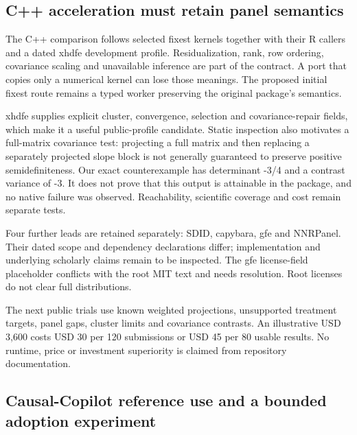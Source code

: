 \hypertarget{c-acceleration-must-retain-panel-semantics}{%
\subsection{C++ acceleration must retain panel
semantics}\label{c-acceleration-must-retain-panel-semantics}}

The C++ comparison follows selected fixest kernels together with their R
callers and a dated xhdfe development profile. Residualization, rank,
row ordering, covariance scaling and unavailable inference are part of
the contract. A port that copies only a numerical kernel can lose those
meanings. The proposed initial fixest route remains a typed worker
preserving the original package's semantics.
\citep{exec25_panelcxx_fixest,exec20_fixest_source}

xhdfe supplies explicit cluster, convergence, selection and
covariance-repair fields, which make it a useful public-profile
candidate. Static inspection also motivates a full-matrix covariance
test: projecting a full matrix and then replacing a separately projected
slope block is not generally guaranteed to preserve positive
semidefiniteness. Our exact counterexample has determinant -3/4 and a
contrast variance of -3. It does not prove that this output is
attainable in the package, and no native failure was observed.
Reachability, scientific coverage and cost remain separate tests.
\citep{exec25_panelcxx_xhdfe,exec25_panelcxx_reference}

Four further leads are retained separately: SDID, capybara, gfe and
NNRPanel. Their dated scope and dependency declarations differ;
implementation and underlying scholarly claims remain to be inspected.
The gfe license-field placeholder conflicts with the root MIT text and
needs resolution. Root licenses do not clear full distributions.
\citep{exec25_panelcxx_sdid,exec25_panelcxx_capybara,exec25_panelcxx_gfe,exec25_panelcxx_nnr}

The next public trials use known weighted projections, unsupported
treatment targets, panel gaps, cluster limits and covariance contrasts.
An illustrative USD 3,600 costs USD 30 per 120 submissions or USD 45 per
80 usable results. No runtime, price or investment superiority is
claimed from repository documentation. \citep{exec25_panelcxx_reference}

\hypertarget{causal-copilot-reference-use-and-a-bounded-adoption-experiment}{%
\subsection{Causal-Copilot reference use and a bounded adoption
experiment}\label{causal-copilot-reference-use-and-a-bounded-adoption-experiment}}

